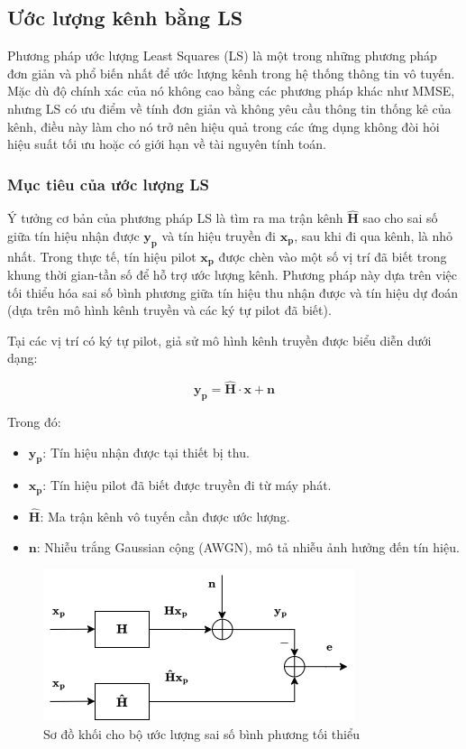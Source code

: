 \subsection{Ước lượng kênh bằng LS}

Phương pháp ước lượng Least Squares (LS) là một trong những phương pháp đơn giản và phổ biến nhất để ước lượng kênh trong hệ thống thông tin vô tuyến. 
Mặc dù độ chính xác của nó không cao bằng các phương pháp khác như MMSE, nhưng LS có ưu điểm về tính đơn giản và không yêu cầu thông tin thống kê của kênh, điều này làm cho nó trở nên hiệu quả trong các ứng dụng không đòi hỏi hiệu suất tối ưu hoặc có giới hạn về tài nguyên tính toán.

\subsubsection{Mục tiêu của ước lượng LS}

Ý tưởng cơ bản của phương pháp LS là tìm ra ma trận kênh $\bm{\hat{H}}$ 
sao cho sai số giữa tín hiệu nhận được $\bm{y_p}$ và tín hiệu truyền đi $\bm{x_p}$, 
sau khi đi qua kênh, là nhỏ nhất. 
Trong thực tế, tín hiệu pilot \( \bm{x_p} \) được chèn vào một số vị trí đã biết trong khung thời gian-tần số để hỗ trợ ước lượng kênh. 
Phương pháp này dựa trên việc tối thiểu hóa sai số bình phương giữa tín hiệu thu nhận được và tín hiệu dự đoán (dựa trên mô hình kênh truyền và các ký tự pilot đã biết).

Tại các vị trí có ký tự pilot, giả sử mô hình kênh truyền được biểu diễn dưới dạng:

\begin{equation}
    \bm{y_p} = \bm{\hat{H}} \cdot \bm{x} + \bm{n}
\end{equation}

Trong đó:
\begin{itemize}
    \item $\bm{y_p}$: Tín hiệu nhận được tại thiết bị thu.
    \item $\bm{x_p}$: Tín hiệu pilot đã biết được truyền đi từ máy phát.
    \item $\bm{\hat{H}}$: Ma trận kênh vô tuyến cần được ước lượng.
    \item $\bm{n}$: Nhiễu trắng Gaussian cộng (AWGN), mô tả nhiễu ảnh hưởng đến tín hiệu.
\end{itemize}

\begin{figure}[H]
    \centering
    \includegraphics[width=0.65\linewidth]{../images/ls_block_diagram.png}
    \caption{Sơ đồ khối cho bộ ước lượng sai số bình phương tối thiểu}
\end{figure}

